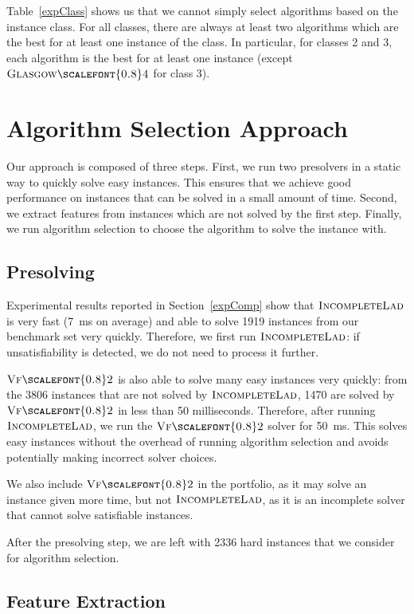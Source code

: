 \documentclass{llncs}
\newcommand{\VFtwo}{$\textsc{Vf{\scalefont{0.8}2}}$\xspace}
\newcommand{\IncompleteLAD}{$\textsc{IncompleteLad}$\xspace}
\newcommand{\GlasgowFour}{$\textsc{Glasgow{\scalefont{0.8}4}}$\xspace}
\begin{document}
Table~\ref{expClass} shows us that we cannot simply select algorithms based on
the instance class. For all
classes, there are always at least two algorithms which are the best for at least one instance of
the class. In particular, for classes 2 and 3, each algorithm is the best for at least one instance
(except \GlasgowFour for class 3).

\section{Algorithm Selection Approach}\label{sec:algsel}

Our approach is composed of three steps. First, we run two presolvers in a
static way to quickly solve easy instances. This ensures that we achieve good
performance on instances that can be solved in a small amount of time. Second,
we extract features from instances which are not solved by the first step.
Finally, we run algorithm selection to choose the algorithm to solve the
instance with.

\subsection{Presolving}

Experimental results reported in Section~\ref{expComp} show that \IncompleteLAD is very fast
(\SI{7}{\ms} on average) and able to solve 1919 instances from our benchmark
set very quickly. Therefore, we first run
\IncompleteLAD: if unsatisfiability is detected, we do not need to process it further.

\VFtwo is also able to solve many easy instances very quickly: from the 3806
instances that are not
solved by \IncompleteLAD, 1470 are solved by \VFtwo in less than 50 milliseconds. Therefore, after
running \IncompleteLAD, we run the \VFtwo solver for \SI{50}{\ms}. This solves easy instances without
the overhead of running algorithm selection and avoids potentially making incorrect solver choices.

We also include \VFtwo in the portfolio, as it may solve an instance given more
time, but not \IncompleteLAD, as it is an incomplete solver that cannot solve
satisfiable instances.

After the presolving step, we are left with 2336 hard instances that we consider
for algorithm selection.

\subsection{Feature Extraction}
\end{document}
